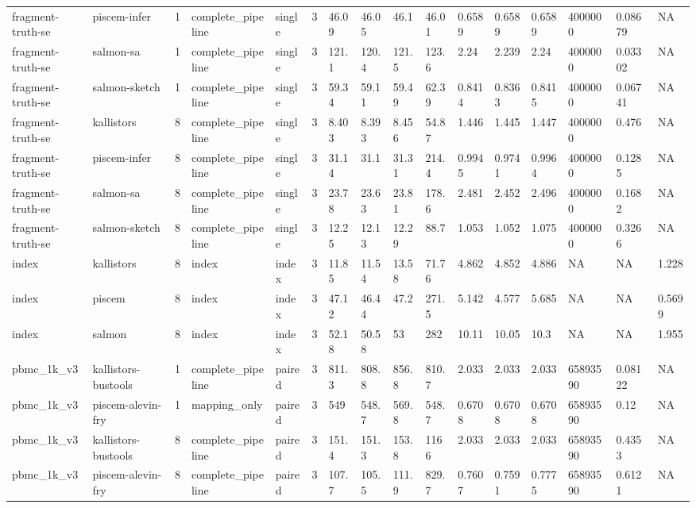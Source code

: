 \begin{tabular}{llllllllllllllll}
fragment-truth-se & piscem-infer & 1 & complete\_pipeline & single & 3 & 46.09 & 46.05 & 46.1 & 46.01 & 0.6589 & 0.6589 & 0.6589 & 4000000 & 0.08679 & NA \\
fragment-truth-se & salmon-sa & 1 & complete\_pipeline & single & 3 & 121.1 & 120.4 & 121.5 & 123.6 & 2.24 & 2.239 & 2.24 & 4000000 & 0.03302 & NA \\
fragment-truth-se & salmon-sketch & 1 & complete\_pipeline & single & 3 & 59.34 & 59.11 & 59.49 & 62.39 & 0.8414 & 0.8363 & 0.8415 & 4000000 & 0.06741 & NA \\
fragment-truth-se & kallistors & 8 & complete\_pipeline & single & 3 & 8.403 & 8.393 & 8.456 & 54.87 & 1.446 & 1.445 & 1.447 & 4000000 & 0.476 & NA \\
fragment-truth-se & piscem-infer & 8 & complete\_pipeline & single & 3 & 31.14 & 31.1 & 31.31 & 214.4 & 0.9945 & 0.9741 & 0.9964 & 4000000 & 0.1285 & NA \\
fragment-truth-se & salmon-sa & 8 & complete\_pipeline & single & 3 & 23.78 & 23.63 & 23.81 & 178.6 & 2.481 & 2.452 & 2.496 & 4000000 & 0.1682 & NA \\
fragment-truth-se & salmon-sketch & 8 & complete\_pipeline & single & 3 & 12.25 & 12.13 & 12.29 & 88.7 & 1.053 & 1.052 & 1.075 & 4000000 & 0.3266 & NA \\
index & kallistors & 8 & index & index & 3 & 11.85 & 11.54 & 13.58 & 71.76 & 4.862 & 4.852 & 4.886 & NA & NA & 1.228 \\
index & piscem & 8 & index & index & 3 & 47.12 & 46.44 & 47.2 & 271.5 & 5.142 & 4.577 & 5.685 & NA & NA & 0.5699 \\
index & salmon & 8 & index & index & 3 & 52.18 & 50.58 & 53 & 282 & 10.11 & 10.05 & 10.3 & NA & NA & 1.955 \\
pbmc\_1k\_v3 & kallistors-bustools & 1 & complete\_pipeline & paired & 3 & 811.3 & 808.8 & 856.8 & 810.7 & 2.033 & 2.033 & 2.033 & 65893590 & 0.08122 & NA \\
pbmc\_1k\_v3 & piscem-alevin-fry & 1 & mapping\_only & paired & 3 & 549 & 548.7 & 569.8 & 548.7 & 0.6708 & 0.6708 & 0.6708 & 65893590 & 0.12 & NA \\
pbmc\_1k\_v3 & kallistors-bustools & 8 & complete\_pipeline & paired & 3 & 151.4 & 151.3 & 153.8 & 1166 & 2.033 & 2.033 & 2.033 & 65893590 & 0.4353 & NA \\
pbmc\_1k\_v3 & piscem-alevin-fry & 8 & complete\_pipeline & paired & 3 & 107.7 & 105.5 & 111.9 & 829.7 & 0.7607 & 0.7591 & 0.7775 & 65893590 & 0.6121 & NA \\
\bottomrule
\end{tabular}
